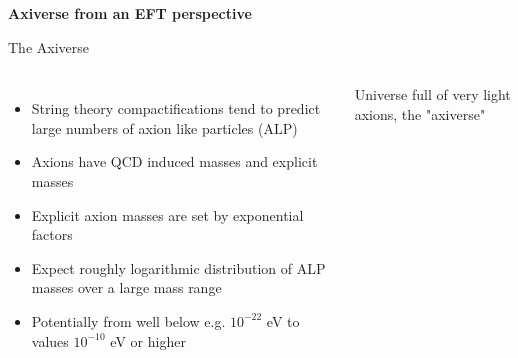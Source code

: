 \documentclass[aspectratio=1610, 9pt]{beamer}
\begin{document}
\begin{frame}[noframenumbering]
  \centering
  \Huge \textbf{\textcolor{tugreen}{Axiverse from an EFT perspective}}
\end{frame}

\begin{frame}{The Axiverse}
  \begin{columns}
    \column{\textwidth}
    \begin{itemize}
      \item String theory compactifications tend to predict large numbers of axion like particles (ALP)
      \item Axions have QCD induced masses and explicit masses
      \item Explicit axion masses are set by exponential factors
      \item Expect roughly logarithmic distribution of ALP masses over a large mass range
      \item Potentially from well below e.g. $10^{-22}$ eV to values $10^{-10}$ eV or higher
    \end{itemize}
    \vspace{1cm}
    \centering
    \rightarrow Universe full of very light axions, the "axiverse"
  \end{columns} 
\end{frame}
\end{document}
